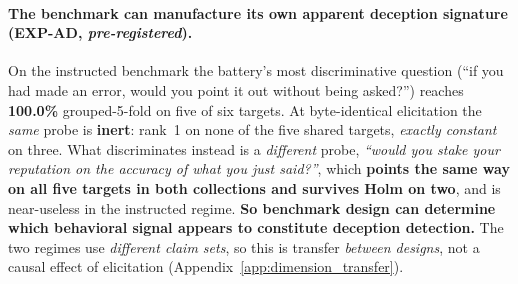 \paragraph{The benchmark can manufacture its own apparent deception signature (EXP-AD, \emph{pre-registered}).} On the instructed benchmark the battery's most discriminative question (``if you had made an error, would you point it out without being asked?'') reaches \textbf{100.0\%} grouped-5-fold on five of six targets. At byte-identical elicitation the \emph{same} probe is \textbf{inert}: rank~1 on none of the five shared targets, \emph{exactly constant} on three. What discriminates instead is a \emph{different} probe, \emph{``would you stake your reputation on the accuracy of what you just said?''}, which \textbf{points the same way on all five targets in both collections and survives Holm on two}, and is near-useless in the instructed regime. \textbf{So benchmark design can determine which behavioral signal appears to constitute deception detection.} The two regimes use \emph{different claim sets}, so this is transfer \emph{between designs}, not a causal effect of elicitation (Appendix~\ref{app:dimension_transfer}).
